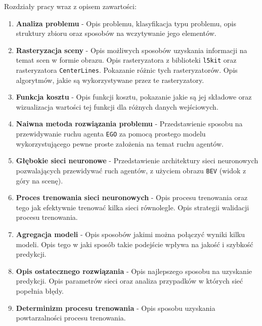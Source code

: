 \noindent Rozdziały pracy wraz z opisem zawartości:
\begin{enumerate}[label*=\arabic*.]
    \setlength{\itemsep}{1pt}
    \setlength{\parskip}{0pt}
    \setlength{\parsep}{0pt}
    \item \textbf{Analiza problemu} - Opis problemu, klasyfikacja typu problemu, opis struktury zbioru oraz sposobów na wczytywanie jego elementów.
    \item \textbf{Rasteryzacja sceny} - Opis możliwych sposobów uzyskania informacji na temat scen w formie obrazu. Opis rasteryzatora z biblioteki \texttt{l5kit} oraz rasteryzatora \texttt{CenterLines}. Pokazanie różnic tych rasteryzatorów. Opis algorytmów, jakie są wykorzystywane przez te rasteryzatory.
    \item \textbf{Funkcja kosztu} - Opis funkcji kosztu, pokazanie jakie są jej składowe oraz wizualizacja wartości tej funkcji dla różnych danych wejściowych.
    \item \textbf{Naiwna metoda rozwiązania problemu} - Przedstawienie sposobu na przewidywanie ruchu agenta \texttt{EGO} za pomocą prostego modelu wykorzystującego pewne proste założenia na temat ruchu agentów.
    \item \textbf{Głębokie sieci neuronowe} - Przedstawienie architektury sieci neuronowych pozwalających przewidywać ruch agentów, z użyciem obrazu \texttt{BEV} (widok z góry na scenę).
    \item \textbf{Proces trenowania sieci neuronowych} - Opis procesu trenowania oraz tego jak efektywnie trenować kilka sieci równolegle. Opis strategii walidacji procesu trenowania.
    \item \textbf{Agregacja modeli} - Opis sposobów jakimi można połączyć wyniki kilku modeli. Opis tego w jaki sposób takie podejście wpływa na jakość i szybkość predykcji.
    \item \textbf{Opis ostatecznego rozwiązania} - Opis najlepszego sposobu na uzyskanie predykcji. Opis parametrów sieci oraz analiza przypadków w których sieć popełnia błędy.
    \item \textbf{Determinizm procesu trenowania} - Opis sposobu uzyskania powtarzalności procesu trenowania.
\end{enumerate}